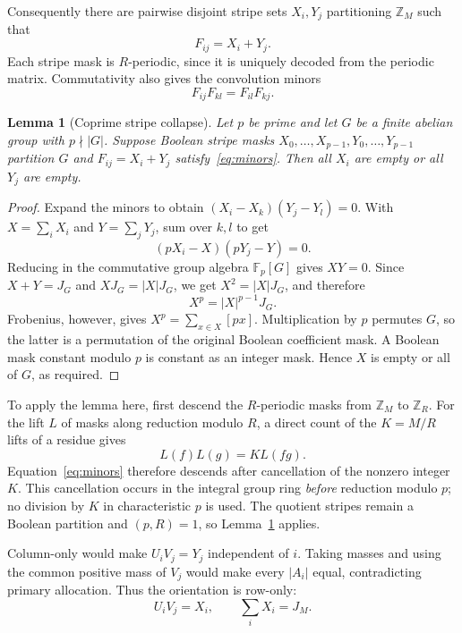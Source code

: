 \documentclass[10pt,a4paper]{amsart}
\newtheorem{lemma}[theorem]{Lemma}
\newcommand{\Z}{\mathbb Z}
\newcommand{\F}{\mathbb F}
\begin{document}
Consequently there are pairwise disjoint stripe sets $X_i,Y_j$ partitioning $\Z_M$ such that
\begin{equation}\label{eq:stripes}
 F_{ij}=X_i+Y_j.
\end{equation}
Each stripe mask is $R$-periodic, since it is uniquely decoded from the periodic matrix. Commutativity also gives the convolution minors
\begin{equation}\label{eq:minors}
 F_{ij}F_{kl}=F_{il}F_{kj}.
\end{equation}

\begin{lemma}[Coprime stripe collapse]\label{lem:collapse}
Let $p$ be prime and let $G$ be a finite abelian group with $p\nmid|G|$. Suppose Boolean stripe masks $X_0,\ldots,X_{p-1},Y_0,\ldots,Y_{p-1}$ partition $G$ and $F_{ij}=X_i+Y_j$ satisfy~\eqref{eq:minors}. Then all $X_i$ are empty or all $Y_j$ are empty.
\end{lemma}
\begin{proof}
Expand the minors to obtain $(X_i-X_k)(Y_j-Y_l)=0$. With $X=\sum_iX_i$ and $Y=\sum_jY_j$, sum over $k,l$ to get
\[
 (pX_i-X)(pY_j-Y)=0.
\]
Reducing in the commutative group algebra $\F_p[G]$ gives $XY=0$. Since $X+Y=J_G$ and $XJ_G=|X|J_G$, we get $X^2=|X|J_G$, and therefore
\[
 X^p=|X|^{p-1}J_G.
\]
Frobenius, however, gives $X^p=\sum_{x\in X}[px]$. Multiplication by $p$ permutes $G$, so the latter is a permutation of the original Boolean coefficient mask. A Boolean mask constant modulo $p$ is constant as an integer mask. Hence $X$ is empty or all of $G$, as required.
\end{proof}

To apply the lemma here, first descend the $R$-periodic masks from $\Z_M$ to $\Z_R$. For the lift $L$ of masks along reduction modulo $R$, a direct count of the $K=M/R$ lifts of a residue gives
\begin{equation}\label{eq:lift}
 L(f)L(g)=K L(fg).
\end{equation}
Equation~\eqref{eq:minors} therefore descends after cancellation of the nonzero integer $K$. This cancellation occurs in the integral group ring \emph{before} reduction modulo $p$; no division by $K$ in characteristic $p$ is used. The quotient stripes remain a Boolean partition and $(p,R)=1$, so Lemma~\ref{lem:collapse} applies.

Column-only would make $U_iV_j=Y_j$ independent of $i$. Taking masses and using the common positive mass of $V_j$ would make every $|A_i|$ equal, contradicting primary allocation. Thus the orientation is row-only:
\begin{equation}\label{eq:rowonly}
 U_iV_j=X_i,\qquad \sum_iX_i=J_M.
\end{equation}
\end{document}
